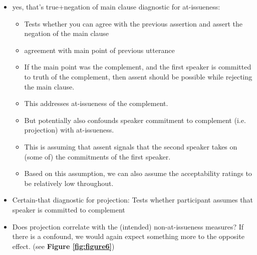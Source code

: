 \documentclass[11pt]{article}
\begin{document}
			\begin{itemize}
				
				\item yes, that's true+negation of main clause diagnostic for at-issueness:
				\begin{itemize}
					\item Tests whether you can agree with the previous assertion and assert the negation of the main clause
					\item agreement with main point of previous utterance
					\item If the main point was the complement, and the first speaker is committed to truth of the complement, then assent should be possible while rejecting the main clause.
					\item This addresses at-issueness of the complement.
					\item But potentially also confounds speaker commitment to complement (i.e. projection) with at-issueness.
					\item This is assuming that assent signals that the second speaker takes on (some of) the commitments of the first speaker.
					\item Based on this assumption, we can also assume the acceptability ratings to be relatively low throughout. %
				\end{itemize}

				
				\item Certain-that diagnostic for projection: Tests whether participant assumes that speaker is committed to complement

				\item Does projection correlate with the (intended) non-at-issueness measures? If there is a confound, we would again expect something more to the opposite effect. (see \textbf{Figure \ref{fig:figure6}})
			\end{itemize}
\end{document}
